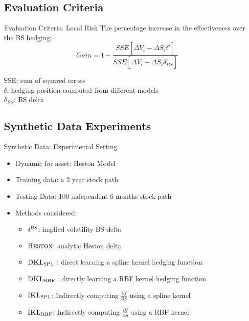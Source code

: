 \documentclass[10pt,table,mathserif]{beamer}
\newcommand{\Heston}{\textsc{Heston}}
\newcommand{\DKLs}{\bf\textsc{DKL}_{\text{SPL}}}
\newcommand{\DKLg}{\bf\textsc{DKL}_{\text{RBF}}}
\newcommand{\IKLs}{\bf\textsc{IKL}_{\text{SPL}}}
\newcommand{\IKLg}{\bf\textsc{IKL}_{\text{RBF}}}
\newcommand{\Del}{\delta^{\textsc{BS}}}
\begin{document}
\subsection{Evaluation Criteria}
\begin{frame}{Evaluation Criteria: Local Risk}
The percentage increase in the effectiveness over the BS hedging:
\[
Gain=1-\frac{SSE[\Delta V_i-\Delta S_i\delta^i]}{SSE[\Delta V_i-\Delta S_i\delta^i_{BS}]}
\]
\begin{center}

SSE: sum of squared errors\\
 $\delta$: hedging position computed from different models\\
 $\delta_{BS}$: BS delta\\
 \end{center}
\end{frame}

\subsection{Synthetic Data Experiments}
\begin{frame}{Synthetic Data: Experimental Setting}
\begin{itemize}
\item Dynamic for asset: Heston Model
\item  Training data: a 2 year stock path
\item  Testing Data: 100 independent 6-months stock path
\item  Methods considered:
 \begin{itemize}
 \item  ${\Del}$:  implied  volatility BS delta
 \item $\Heston$:   analytic Heston delta
 \item $\DKLs$ : direct learning a spline kernel hedging  function
 \item $\DKLg$ : directly learning a RBF kernel hedging  function
 \item ${\IKLs}$: Indirectly computing $\frac{\partial f}{\partial S}$  using a spline kernel

\item ${\IKLg}$: Indirectly computing $\frac{\partial f}{\partial S}$ using a RBF kernel

\end{itemize}

\end{itemize}
\end{frame}
\end{document}
